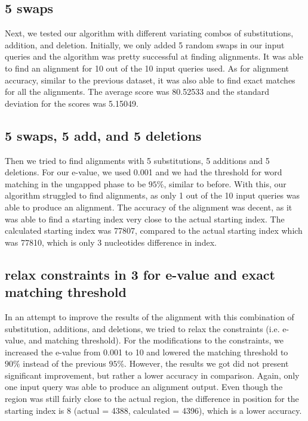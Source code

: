 \documentclass{article}
\begin{document}
\subsection*{5 swaps}
Next, we tested our algorithm with different variating combos of substitutions, addition, and deletion. Initially, we only added 5 random swaps in our input queries and the algorithm was pretty successful at finding alignments. It was able to find an alignment for 10 out of the 10 input queries used. As for alignment accuracy, similar to the previous dataset, it was also able to find exact matches for all the alignments. The average score was 80.52533 and the standard deviation for the scores was 5.15049.\\

\subsection*{5 swaps, 5 add, and 5 deletions}
Then we tried to find alignments with 5 substitutions, 5 additions and 5 deletions. For our e-value, we used 0.001 and we had the threshold for word matching in the ungapped phase to be $95\%$, similar to before. With this, our algorithm struggled to find alignments, as only 1 out of the 10 input queries was able to produce an alignment. The accuracy of the alignment was decent, as it was able to find a starting index very close to the actual starting index. The calculated starting index was 77807, compared to the actual starting index which was 77810, which is only 3 nucleotides difference in index.



\subsection*{relax constraints in 3 for e-value and exact matching threshold}
In an attempt to improve the results of the alignment with this combination of substitution, additions, and deletions, we tried to relax the constraints (i.e. e-value, and matching threshold). For the modifications to the constraints, we increased the e-value from 0.001 to 10 and lowered the matching threshold to $90\%$ instead of the previous $95\%$. However, the results we got did not present significant improvement, but rather a lower accuracy in comparison. Again, only one input query was able to produce an alignment output. Even though the region was still fairly close to the actual region, the difference in position for the starting index is 8 (actual = 4388, calculated = 4396), which is a lower accuracy.\\
\end{document}
